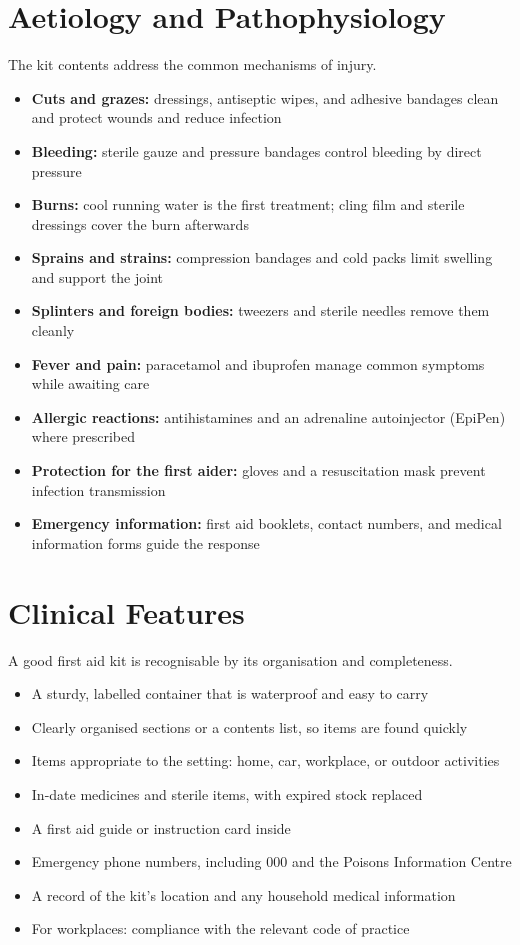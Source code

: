 \section*{Aetiology and Pathophysiology}
The kit contents address the common mechanisms of injury.
\begin{itemize}
    \item \textbf{Cuts and grazes:} dressings, antiseptic wipes, and adhesive bandages clean and protect wounds and reduce infection
    \item \textbf{Bleeding:} sterile gauze and pressure bandages control bleeding by direct pressure
    \item \textbf{Burns:} cool running water is the first treatment; cling film and sterile dressings cover the burn afterwards
    \item \textbf{Sprains and strains:} compression bandages and cold packs limit swelling and support the joint
    \item \textbf{Splinters and foreign bodies:} tweezers and sterile needles remove them cleanly
    \item \textbf{Fever and pain:} paracetamol and ibuprofen manage common symptoms while awaiting care
    \item \textbf{Allergic reactions:} antihistamines and an adrenaline autoinjector (EpiPen) where prescribed
    \item \textbf{Protection for the first aider:} gloves and a resuscitation mask prevent infection transmission
    \item \textbf{Emergency information:} first aid booklets, contact numbers, and medical information forms guide the response
\end{itemize}

\section*{Clinical Features}
A good first aid kit is recognisable by its organisation and completeness.
\begin{itemize}
    \item A sturdy, labelled container that is waterproof and easy to carry
    \item Clearly organised sections or a contents list, so items are found quickly
    \item Items appropriate to the setting: home, car, workplace, or outdoor activities
    \item In-date medicines and sterile items, with expired stock replaced
    \item A first aid guide or instruction card inside
    \item Emergency phone numbers, including 000 and the Poisons Information Centre
    \item A record of the kit's location and any household medical information
    \item For workplaces: compliance with the relevant code of practice
\end{itemize}

